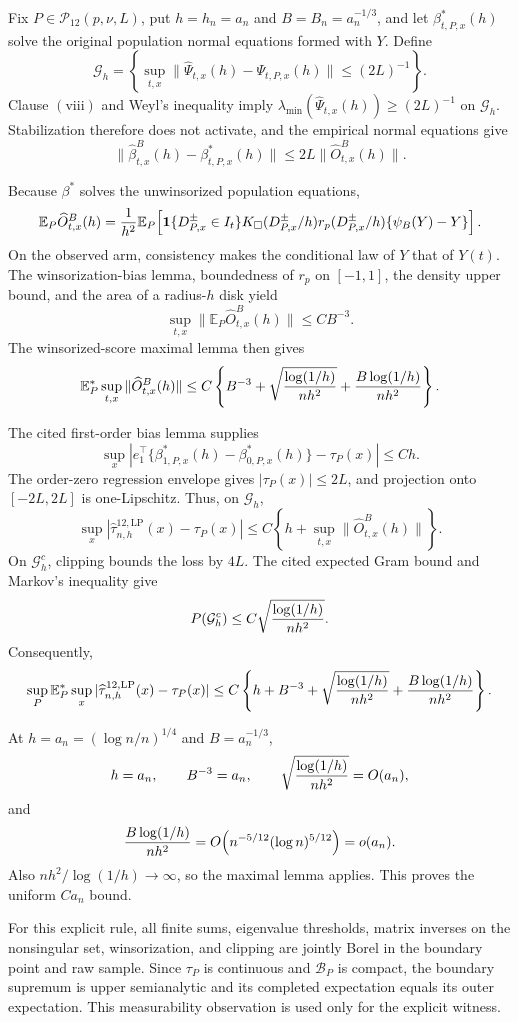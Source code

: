 Fix \(P\in\mathcal P_{12}(p,\nu,L)\), put \(h=h_n=a_n\) and \(B=B_n=a_n^{-1/3}\), and let \(\beta^*_{t,P,x}(h)\) solve the original population normal equations formed with \(Y\).  Define
\[
 \mathcal G_h=\left\{
 \sup_{t,x}\|\widehat\Psi_{t,x}(h)-\Psi_{t,P,x}(h)\|
 \leq(2L)^{-1}\right\}.
\]
Clause \(\mathrm{(viii)}\) and Weyl's inequality imply \(\lambda_{\min}(\widehat\Psi_{t,x}(h))\geq(2L)^{-1}\) on \(\mathcal G_h\).  Stabilization therefore does not activate, and the empirical normal equations give
\[
 \|\widehat\beta^B_{t,x}(h)-\beta^*_{t,P,x}(h)\|
 \leq2L\|\widehat O^B_{t,x}(h)\|.
\]

Because \(\beta^*\) solves the unwinsorized population equations,
\[
 \mathbb E_P\widehat O^B_{t,x}(h)
 ={1\over h^2}\mathbb E_P\!\left[
 \mathbf1\{D^{\pm}_{P,x}\in I_t\}K_\square(D^{\pm}_{P,x}/h)
 r_p(D^{\pm}_{P,x}/h)\{\psi_B(Y)-Y\}\right].
\]
On the observed arm, consistency makes the conditional law of \(Y\) that of \(Y(t)\).  The winsorization-bias lemma, boundedness of \(r_p\) on \([-1,1]\), the density upper bound, and the area of a radius-\(h\) disk yield
\[
 \sup_{t,x}\|\mathbb E_P\widehat O^B_{t,x}(h)\|\leq CB^{-3}.
\]
The winsorized-score maximal lemma then gives
\[
 \mathbb E_P^*\sup_{t,x}\|\widehat O^B_{t,x}(h)\|
 \leq C\left\{B^{-3}+\sqrt{{\log(1/h)\over nh^2}}
 +{B\log(1/h)\over nh^2}\right\}.
\]

The cited first-order bias lemma supplies
\[
 \sup_x\left|e_1^\top\{\beta^*_{1,P,x}(h)-\beta^*_{0,P,x}(h)\}-\tau_P(x)\right|
 \leq Ch.
\]
The order-zero regression envelope gives \(|\tau_P(x)|\leq2L\), and projection onto \([-2L,2L]\) is one-Lipschitz.  Thus, on \(\mathcal G_h\),
\[
 \sup_x|\widehat\tau^{12,\mathrm{LP}}_{n,h}(x)-\tau_P(x)|
 \leq C\left\{h+\sup_{t,x}\|\widehat O^B_{t,x}(h)\|\right\}.
\]
On \(\mathcal G_h^c\), clipping bounds the loss by \(4L\).  The cited expected Gram bound and Markov's inequality give
\[
 P(\mathcal G_h^c)
 \leq C\sqrt{{\log(1/h)\over nh^2}}.
\]
Consequently,
\[
 \sup_P\mathbb E_P^*\sup_x|\widehat\tau^{12,\mathrm{LP}}_{n,h}(x)-\tau_P(x)|
 \leq C\left\{h+B^{-3}+\sqrt{{\log(1/h)\over nh^2}}
 +{B\log(1/h)\over nh^2}\right\}.
\]

At \(h=a_n=(\log n/n)^{1/4}\) and \(B=a_n^{-1/3}\),
\[
 h=a_n,
 \qquad B^{-3}=a_n,
 \qquad \sqrt{{\log(1/h)\over nh^2}}=O(a_n),
\]
and
\[
 {B\log(1/h)\over nh^2}
 =O\!\left(n^{-5/12}(\log n)^{5/12}\right)=o(a_n).
\]
Also \(nh^2/\log(1/h)\to\infty\), so the maximal lemma applies.  This proves the uniform \(Ca_n\) bound.

For this explicit rule, all finite sums, eigenvalue thresholds, matrix inverses on the nonsingular set, winsorization, and clipping are jointly Borel in the boundary point and raw sample.  Since \(\tau_P\) is continuous and \(\mathcal B_P\) is compact, the boundary supremum is upper semianalytic and its completed expectation equals its outer expectation.  This measurability observation is used only for the explicit witness.
